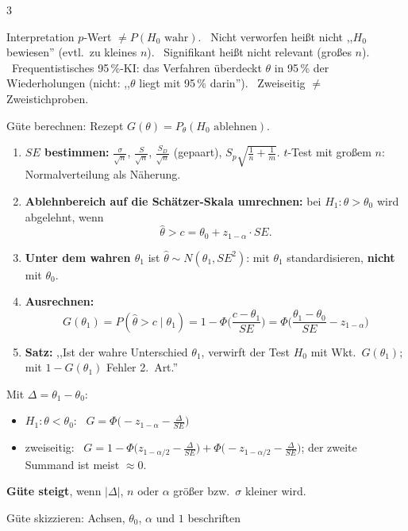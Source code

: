 \documentclass[8pt,a4paper,landscape]{extarticle}
\begin{document}
\begin{multicols*}{3}
\begin{falle}{Interpretation}
$p$-Wert $\neq P(H_0\text{ wahr})$. \ Nicht verworfen heißt nicht ,,$H_0$ bewiesen'' (evtl.\ zu kleines $n$). \ Signifikant heißt nicht relevant (großes $n$). \ Frequentistisches 95\,\%-KI: das Verfahren überdeckt $\theta$ in 95\,\% der Wiederholungen (nicht: ,,$\theta$ liegt mit 95\,\% darin''). \ Zweiseitig $\neq$ Zweistichproben.
\end{falle}
\begin{rechnen}{Güte berechnen: Rezept}
$G(\theta)=P_\theta(H_0\text{ ablehnen})$.
\begin{enumerate}[leftmargin=10pt]
\item \textbf{$SE$ bestimmen:} $\frac{\sigma}{\sqrt n}$, $\frac{S}{\sqrt n}$, $\frac{S_D}{\sqrt n}$ (gepaart), $S_p\sqrt{\frac1n+\frac1m}$. $t$-Test mit großem $n$: Normalverteilung als Näherung.
\item \textbf{Ablehnbereich auf die Schätzer-Skala umrechnen:} bei $H_1:\theta>\theta_0$ wird abgelehnt, wenn
$$\hat\theta>c=\theta_0+z_{1-\alpha}\cdot SE.$$
\item \textbf{Unter dem wahren $\theta_1$} ist $\hat\theta\sim N(\theta_1,SE^2)$: mit $\theta_1$ standardisieren, \textbf{nicht} mit $\theta_0$.
\item \textbf{Ausrechnen:}
$$G(\theta_1)=P(\hat\theta>c\mid\theta_1)=1-\Phi\Big(\frac{c-\theta_1}{SE}\Big)=\Phi\Big(\frac{\theta_1-\theta_0}{SE}-z_{1-\alpha}\Big)$$
\item \textbf{Satz:} ,,Ist der wahre Unterschied $\theta_1$, verwirft der Test $H_0$ mit Wkt.\ $G(\theta_1)$; mit $1-G(\theta_1)$ Fehler 2.\ Art.''
\end{enumerate}
Mit $\Delta=\theta_1-\theta_0$:
\begin{itemize}
\item $H_1:\theta<\theta_0$: \ $G=\Phi\big(-z_{1-\alpha}-\frac{\Delta}{SE}\big)$
\item zweiseitig: \ $G=1-\Phi\big(z_{1-\alpha/2}-\frac{\Delta}{SE}\big)+\Phi\big(-z_{1-\alpha/2}-\frac{\Delta}{SE}\big)$; der zweite Summand ist meist $\approx 0$.
\end{itemize}
\textbf{Güte steigt}, wenn $|\Delta|$, $n$ oder $\alpha$ größer bzw.\ $\sigma$ kleiner wird.
\end{rechnen}
\begin{wissen}{Güte skizzieren: Achsen, $\theta_0$, $\alpha$ und $1$ beschriften}
\begin{center}
\begin{tikzpicture}[x=0.52cm,y=1.1cm,font=\fontsize{8}{9}\selectfont]

\end{tikzpicture}
\end{center}
\end{wissen}
\end{multicols*}
\end{document}
